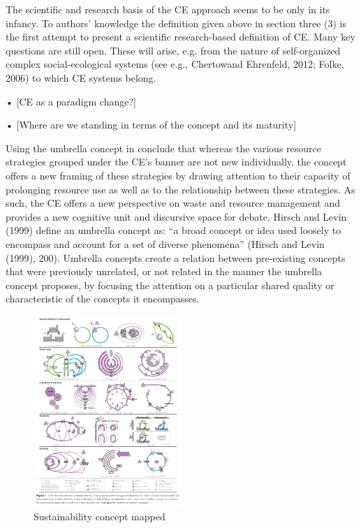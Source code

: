 The scientific and research basis of the CE approach seems to be only in its infancy. To authors' knowledge the definition given above in section three (3) is the first attempt to present a scientific research-based definition of CE. Many key questions are still open. These will arise, e.g. from the nature of self-organized complex social-ecological systems (see e.g., Chertowand Ehrenfeld, 2012; Folke, 2006) to which CE systems belong.



•	[CE as a paradigm change?] \par 
 \parencite{Geissdoerfer2017}

•	[Where are we standing in terms of the concept and its maturity] \par
\parencite{Blomsma2017}

Using the umbrella concept in \textcite{Blomsma2017} conclude that whereas the various resource strategies grouped under the CE’s banner are not new individually, the concept offers a new framing of these strategies by drawing attention to their capacity of prolonging resource use as well as to the relationship between these strategies. As such, the CE offers a new perspective on waste and resource management and provides a new cognitive unit and discursive space for debate. 
Hirsch and Levin (1999) define an umbrella concept as: “a broad concept or idea used loosely to encompass and account for a set of diverse phenomena” (Hirsch and Levin (1999), 200). Umbrella concepts create a relation between pre-existing concepts that were previously unrelated, or not related in the manner the umbrella concept proposes, by focusing the attention on a particular shared quality or characteristic of the concepts it encompasses.


\begin{figure}[h!]
    \centering
    \includegraphics[width=0.5\textwidth]{sections/asset/ce_frameworks.PNG}
    \caption{Sustainability concept mapped}
    \label{fig:sustainable_map}
\end{figure}



